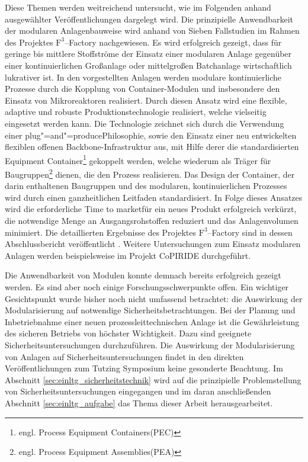 Diese Themen werden weitreichend untersucht, wie im Folgenden anhand ausgew\"ahlter Ver\"offentlichungen dargelegt wird. Die prinzipielle Anwendbarkeit der modularen Anlagenbauweise wird anhand von Sieben Fallstudien im Rahmen des Projektes $\text{F}^{3}$--Factory nachgewiesen. Es wird erfolgreich gezeigt, dass f\"ur geringe bis mittlere Stoffstr\"ome der Einsatz einer modularen Anlage gegen\"uber einer kontinuierlichen Gro\ss{}anlage oder mittelgro\ss{}en Batchanlage wirtschaftlich lukrativer ist. In den vorgestellten Anlagen werden modulare kontinuierliche Prozesse durch die Kopplung von Container-Modulen und insbesondere den Einsatz von Mikroreaktoren realisiert. Durch diesen Ansatz wird eine flexible, adaptive und robuste Produktionstechnologie realisiert, welche vielseitig eingesetzt werden kann. Die Technologie zeichnet sich durch die Verwendung einer \glqq plug"=and"=produce\grqq { }Philosophie, sowie den Einsatz einer neu entwickelten flexiblen offenen Backbone-Infrastruktur aus, mit Hilfe derer die standardisierten Equipment Container\footnote{engl. \glqq Process Equipment Containers\grqq { }(PEC)} gekoppelt werden, welche wiederum als Tr\"ager f\"ur Baugruppen\footnote{engl. \glqq Process Equipment Assemblies\grqq { }(PEA)} dienen, die den Prozess realisieren. Das Design der Container, der darin enthaltenen Baugruppen und des modularen,  kontinuierlichen Prozesses wird durch einen ganzheitlichen Leitfaden standardisiert. In Folge dieses Ansatzes wird die erforderliche \glqq Time to market\grqq { }f\"ur ein neues Produkt erfolgreich verk\"urzt, die notwendige Menge an Ausgangsrohstoffen reduziert und das Anlagenvolumen minimiert. Die detaillierten Ergebnisse des Projektes $\text{F}^{3}$--Factory sind in dessen Abschlussbericht ver\"offentlicht \cite{f3_2014}.  \newline
Weitere Untersuchungen zum Einsatz modularen Anlagen werden beispielsweise im Projekt CoPIRIDE \cite{copiride_2014} durchgef\"uhrt.

Die Anwendbarkeit von Modulen konnte demnach bereits erfolgreich gezeigt werden. Es sind aber noch einige Forschungsschwerpunkte offen. Ein wichtiger Gesichtspunkt wurde bisher noch nicht umfassend betrachtet: die Auswirkung der Modularisierung auf notwendige Sicherheitsbetrachtungen. \newline
Bei der Planung und Inbetriebnahme einer neuen prozessleittechnischen Anlage ist die Gew\"ahrleistung des sicheren Betriebs von h\"ochster Wichtigkeit. Dazu sind geeignete Sicherheitsuntersuchungen durchzuf\"uhren. Die Auswirkung der Modularisierung von Anlagen auf Sicherheitsuntersuchungen findet in den direkten Ver\"offentlichungen zum Tutzing Symposium keine gesonderte Beachtung. Im Abschnitt \ref{sec:einltg_sicherheitstechnik} wird auf die prinzipielle Problemstellung von Sicherheitsuntersuchungen eingegangen und im daran anschlie\ss{}enden Abschnitt \ref{sec:einltg_aufgabe} das Thema dieser Arbeit herausgearbeitet. 

